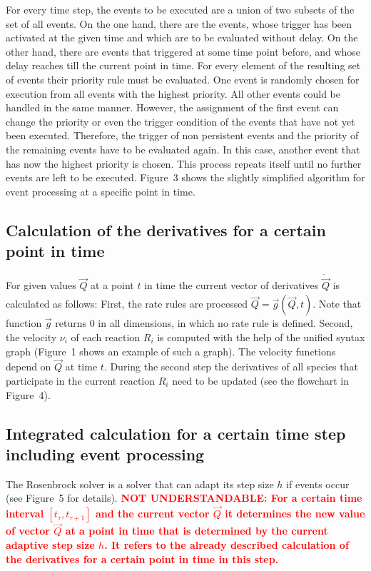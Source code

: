 \documentclass[10pt]{bmc_article}
\newenvironment{bmcformat}{\baselineskip20pt\sloppy\setboolean{publ}{false}}{\baselineskip20pt\sloppy}
\newcommand{\TODO}[1]{\textcolor{red}{\textbf{#1}}}
\begin{document}
\begin{bmcformat}
For every time step, the events to be executed are a union of two subsets of the set of all events.
On the one hand, there are the events, whose trigger has been activated at the given time and which are to be evaluated without delay.
On the other hand, there are events that triggered at some time point before, and whose delay reaches till the current point in time.
For every element of the resulting set of events their priority rule must be evaluated.
One event is randomly chosen for execution from all events with the highest priority.
All other events could be handled in the same manner.
However, the assignment of the first event can change the priority or even the trigger condition of the events that have not yet been executed.
Therefore, the trigger of non persistent events and the priority of the remaining events have to be evaluated again.
In this case, another event that has now the highest priority is chosen.
This process repeats itself until no further events are left to be executed.
Figure~3 shows the slightly simplified algorithm for event processing at a specific point in time.

\subsection*{Calculation of the derivatives for a certain point in time}
For given values $\vec{Q}$ at a point $t$ in time the current vector of derivatives $\dot{\vec{Q}}$ is calculated as follows:
First, the rate rules are processed $\dot{\vec{Q}} = \vec{g}(\vec{Q}, t)$. Note that function $\vec{g}$ returns 0 in all dimensions,
in which no rate rule is defined.
Second, the velocity $\nu_i$ of each reaction $R_i$ is computed with the help of the unified syntax graph (Figure~1 shows an example of such a graph).
The velocity functions depend on $\vec{Q}$ at time $t$.
During the second step the derivatives of all species that participate in the current reaction $R_i$ need to be updated (see the flowchart in Figure~4).

\subsection*{Integrated calculation for a certain time step including event processing}
The Rosenbrock solver is a solver that can adapt its step size $h$ if events occur (see Figure~5 for details).
\TODO{NOT UNDERSTANDABLE: For a certain time interval $[t_{\tau}, t_{\tau + 1}]$ and the current vector $\vec{Q}$ it determines the new value of vector $\vec{Q}$ at a point in time that is determined by the current adaptive step size $h$.
It refers to the already described calculation of the derivatives for a certain point in time in this step.}


\end{bmcformat}
\end{document}
